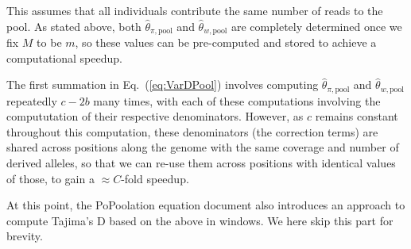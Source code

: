 \documentclass[letterpaper,fontsize=9pt,DIV=12]{scrartcl}
\newcommand\eqnref[1]{Eq.~(\ref{#1})}
\begin{document}
This assumes that all individuals contribute the same number of reads to the pool.
As stated above, both $\widehat{\theta}_{\pi,\text{pool}}$ and $\widehat{\theta}_{w, \text{pool}}$ are completely determined once we fix $M$ to be $m$, so these values can be pre-computed and stored to achieve a computational speedup.

The first summation in \eqnref{eq:VarDPool} involves computing $\widehat{\theta}_{\pi,\text{pool}}$ and 
$\widehat{\theta}_{w,\text{pool}}$ repeatedly $c-2b$ many times, 
with each of these computations involving the compututation of their respective denominators.
However, as $c$ remains constant throughout this computation, these denominators (the correction terms)
are shared across positions along the genome with the same coverage and number of derived alleles, so that we can re-use them across positions with identical values of those, to gain a $\approx C$-fold speedup.

At this point, the PoPoolation equation document also introduces an approach to compute Tajima's D based on the above in windows.
We here skip this part for brevity.



\end{document}
